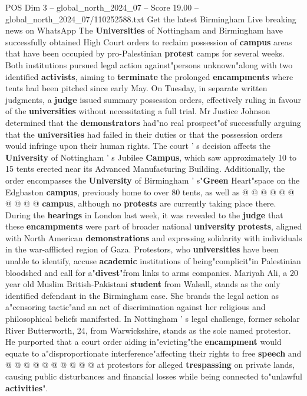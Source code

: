 \begin{textsample}{POS Dim 3 – global\_north\_2024\_07 – Score 19.00 – global\_north\_2024\_07/110252588.txt}  \label{ex:f3_pos_083}
Get the latest Birmingham Live breaking news on WhatsApp The \textbf{Universities} of Nottingham and Birmingham have successfully obtained High Court orders to reclaim possession of \textbf{campus} areas that have been occupied by pro-Palestinian \textbf{protest} camps for several weeks.
Both institutions pursued legal action against"persons unknown"along with two identified \textbf{activists}, aiming to \textbf{terminate} the prolonged \textbf{encampments} where tents had been pitched since early May.
On Tuesday, in separate written judgments, a \textbf{judge} issued summary possession orders, effectively ruling in favour of the \textbf{universities} without necessitating a full trial.
Mr Justice Johnson determined that the \textbf{demonstrators} had"no real prospect"of successfully arguing that the \textbf{universities} had failed in their duties or that the possession orders would infringe upon their human rights.
The court ' s decision affects the \textbf{University} of Nottingham ' s Jubilee \textbf{Campus}, which saw approximately 10 to 15 tents erected near its Advanced Manufacturing Building.
Additionally, the order encompasses the \textbf{University} of Birmingham ' s"\textbf{Green} Heart"space on the Edgbaston \textbf{campus}, previously home to over 80 tents, as well as @ @ @ @ @ @ @ @ @ @ \textbf{campus}, although no \textbf{protests} are currently taking place there.
During the \textbf{hearings} in London last week, it was revealed to the \textbf{judge} that these \textbf{encampments} were part of broader national \textbf{university} \textbf{protests}, aligned with North American \textbf{demonstrations} and expressing solidarity with individuals in the war-afflicted region of Gaza.
Protestors, who \textbf{universities} have been unable to identify, accuse \textbf{academic} institutions of being"complicit"in Palestinian bloodshed and call for a"\textbf{divest}"from links to arms companies.
Mariyah Ali, a 20 year old Muslim British-Pakistani \textbf{student} from Walsall, stands as the only identified defendant in the Birmingham case.
She brands the legal action as a"censoring tactic"and an act of discrimination against her religious and philosophical beliefs manifested.
In Nottingham ' s legal challenge, former scholar River Butterworth, 24, from Warwickshire, stands as the sole named protestor.
He purported that a court order aiding in"evicting"the \textbf{encampment} would equate to a"disproportionate interference"affecting their rights to free \textbf{speech} and @ @ @ @ @ @ @ @ @ @ at protestors for alleged \textbf{trespassing} on private lands, causing public disturbances and financial losses while being connected to"unlawful \textbf{activities}".

\end{textsample}
